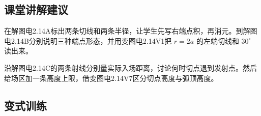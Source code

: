 \documentclass[UTF8,fontset=fandol,a4paper,11pt]{ctexart}
\begin{document}


\subsection*{课堂讲解建议}

在解图电2.14A标出两条切线和两条半径，让学生先写右端点积，再消元。到解图电2.14B分别说明三种端点形态，并用变图电2.14V1把 $r=2a$ 的左端切线和 $30^\circ$ 读出来。

沿解图电2.14C的两条射线分别量实际入场距离，讨论何时切点退到发射点。然后给场区加一条高度上限，借变图电2.14V7区分切点高度与弧顶高度。


\subsection*{变式训练}
\end{document}
